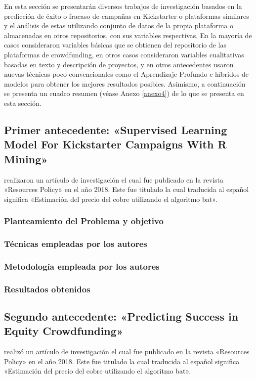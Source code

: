 En esta sección se presentarán diversos trabajos de investigación basados en la predicción de éxito o fracaso de campañas en Kickstarter o plataformas similares y el análisis de estas utilizando conjunto de datos de la propia plataforma o almacenadas en otros repositorios, con sus variables respectivas. En la mayoría de casos consideraron variables básicas que se obtienen del repositorio de las plataformas de crowdfunding, en otros casos consideraron variables cualitativas basadas en texto y descripción de proyectos, y en otros antecedentes usaron nuevas técnicas poco convencionales como el Aprendizaje Profundo e híbridos de modelos para obtener los mejores resultados posibles.
Asimismo, a continuación se presenta un cuadro resumen (véase Anexo \ref{anexo4}) de lo que se presenta en esta sección.

\subsection{Primer antecedente: «Supervised Learning Model For Kickstarter Campaigns With R Mining» \citep*{pr_kamath2018suplearn}}
\citeauthor{pr_kamath2018suplearn} realizaron un artículo de investigación el cual fue publicado en la revista «Resources Policy» en el año 2018. Este fue titulado  la cual traducida al español significa «Estimación del precio del cobre utilizando el algoritmo bat».

\subsubsection{Planteamiento del Problema y objetivo }


\subsubsection{Técnicas empleadas por los autores}
 

\subsubsection{Metodología empleada por los autores}


\subsubsection{Resultados obtenidos}



\subsection{Segundo antecedente: «Predicting Success in Equity Crowdfunding» \citep*{pr_beckwith2016predcrowd}}
\citeauthor{pr_beckwith2016predcrowd} realizó un artículo de investigación el cual fue publicado en la revista «Resources Policy» en el año 2018. Este fue titulado  la cual traducida al español significa «Estimación del precio del cobre utilizando el algoritmo bat».

